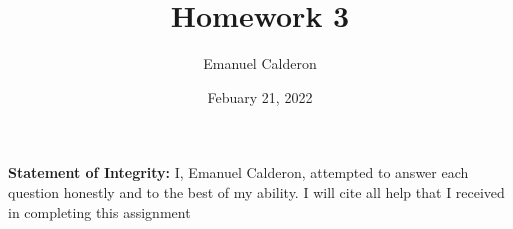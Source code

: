 \documentclass{article}
\title{Homework 3}
\author{Emanuel Calderon}
\date{Febuary 21, 2022}
\begin{document}
\maketitle
\section*{}
\textbf{Statement of Integrity:} I, Emanuel Calderon, attempted to answer each question honestly and to the best of my ability. I will cite all help that I received in completing this assignment
    

    
\end{document}
